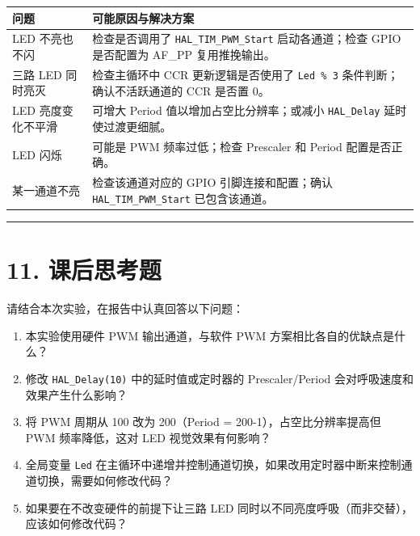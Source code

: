 \documentclass[
  chinese,
  UTF8,
  oneside,
  openany]{ctexbook}
\providecommand{\tightlist}{%
  \setlength{\itemsep}{0pt}\setlength{\parskip}{0pt}}
\begin{document}
\begin{longtable}[]{@{}
  >{\raggedright\arraybackslash}p{}
  >{\raggedright\arraybackslash}p{}@{}}
\toprule\noalign{}
\begin{minipage}[b]{\linewidth}\raggedright
问题
\end{minipage} & \begin{minipage}[b]{\linewidth}\raggedright
可能原因与解决方案
\end{minipage} \\
\midrule\noalign{}
\endhead
\bottomrule\noalign{}
\endlastfoot
LED 不亮也不闪 & 检查是否调用了 \texttt{HAL\_TIM\_PWM\_Start}
启动各通道；检查 GPIO 是否配置为 AF\_PP 复用推挽输出。 \\
三路 LED 同时亮灭 & 检查主循环中 CCR 更新逻辑是否使用了
\texttt{Led\ \%\ 3} 条件判断；确认不活跃通道的 CCR 是否置 0。 \\
LED 亮度变化不平滑 & 可增大 Period 值以增加占空比分辨率；或减小
\texttt{HAL\_Delay} 延时使过渡更细腻。 \\
LED 闪烁 & 可能是 PWM 频率过低；检查 Prescaler 和 Period
配置是否正确。 \\
某一通道不亮 & 检查该通道对应的 GPIO 引脚连接和配置；确认
\texttt{HAL\_TIM\_PWM\_Start} 已包含该通道。 \\
\end{longtable}

\begin{center}\rule{0.5\linewidth}{0.5pt}\end{center}

\section{11. 课后思考题}\label{ux8bfeux540eux601dux8003ux9898-4}

请结合本次实验，在报告中认真回答以下问题：

\begin{enumerate}
\def\labelenumi{\arabic{enumi}.}
\tightlist
\item
  本实验使用硬件 PWM 输出通道，与软件 PWM 方案相比各自的优缺点是什么？
\item
  修改 \texttt{HAL\_Delay(10)} 中的延时值或定时器的 Prescaler/Period
  会对呼吸速度和效果产生什么影响？
\item
  将 PWM 周期从 100 改为 200（Period = 200-1），占空比分辨率提高但 PWM
  频率降低，这对 LED 视觉效果有何影响？
\item
  全局变量 \texttt{Led}
  在主循环中递增并控制通道切换，如果改用定时器中断来控制通道切换，需要如何修改代码？
\item
  如果要在不改变硬件的前提下让三路 LED
  同时以不同亮度呼吸（而非交替），应该如何修改代码？
\end{enumerate}
\end{document}
